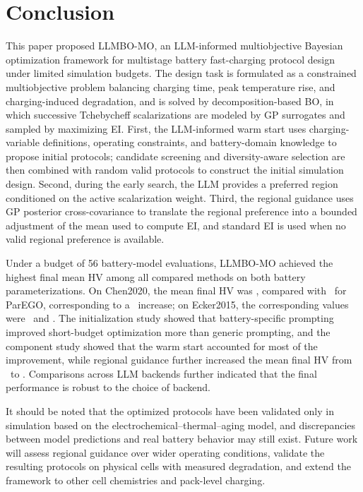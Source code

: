\section{Conclusion}
\label{sec:conclusion}

This paper proposed LLMBO-MO, an LLM-informed multiobjective Bayesian
optimization framework for multistage battery fast-charging protocol design
under limited simulation budgets. The design task is formulated as a
constrained multiobjective problem balancing charging time, peak temperature
rise, and charging-induced degradation, and is solved by decomposition-based
BO, in which successive Tchebycheff scalarizations are modeled by GP
surrogates and sampled by maximizing EI. First, the LLM-informed warm start
uses charging-variable definitions, operating constraints, and battery-domain
knowledge to propose initial protocols; candidate screening and
diversity-aware selection are then combined with random valid protocols to
construct the initial simulation design. Second, during the early search, the
LLM provides a preferred region conditioned on the active scalarization
weight. Third, the regional guidance uses GP posterior cross-covariance to
translate
the regional preference into a bounded adjustment of the mean used to compute
EI, and standard EI is used when no valid regional preference is available.

Under a budget of 56 battery-model evaluations, LLMBO-MO achieved the highest
final mean HV among all compared methods on both battery parameterizations.
On Chen2020, the mean final HV was \ChenLLMBOMean, compared with
\ChenParEGOMean\ for ParEGO, corresponding to a \ChenFinalGain\ increase; on
Ecker2015, the corresponding values were \EckerLLMBOMean\ and
\EckerParEGOMean. The initialization study showed that battery-specific
prompting improved short-budget optimization more than generic prompting,
and the component study showed that the warm start accounted for
most of the improvement, while regional guidance further increased the mean
final HV from \AblationWarmMean\ to \AblationFullMean. Comparisons across LLM
backends further indicated that the final performance is robust to the
choice of backend.

It should be noted that the optimized protocols have been validated only in
simulation based on the electrochemical--thermal--aging model, and
discrepancies between model predictions and real battery behavior may still
exist. Future work will assess regional guidance over wider operating
conditions, validate the resulting protocols on physical cells with measured
degradation, and extend the framework to other cell chemistries and
pack-level charging.

